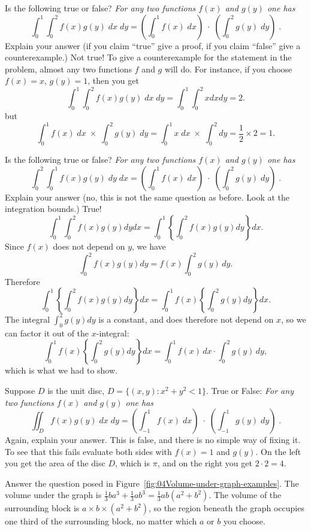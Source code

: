 \problem 
\subprob Is the following true or false? 
  \textit{For any two functions $f(x)$ and $g(y)$ one has}
\[
\int_0^1 \int_0^2 f(x) g(y) \; dx\; dy
= 
\left(\int_0^1 f(x) \; dx\right)
\; \cdot\; 
\left(\int_0^2 g(y)\; dy\right)
\; .
\]
Explain your answer  (if you claim ``true'' give a proof, if you claim ``false'' give
a counterexample.)
\answer
Not true!
To give a counterexample for the statement in the problem, almost any
two functions $f$ and $g$ will do.  For instance, if you choose $f(x) = x$, $g(y)=1$, then you get
\[
\int_0^1 \int_0^2 f(x) g(y) \; dx\; dy= \int_0^1\int_0^2 xdx dy = 2.
\]
but
\[
\int_0^1 f(x) \; dx\; \times\; 
\int_0^2 g(y)\; dy
=
\int_0^1 x \; dx\; \times\; 
\int_0^2  dy
=
\frac{1}{2}\times2 = 1.
\]
\endanswer

\subprob Is the following true or false? 
  \textit{For any two functions $f(x)$ and $g(y)$ one has}
\[
\int_0^2 \int_0^1 f(x) g(y) \; dy\; dx
= 
\left(\int_0^1 f(x) \; dx\right)
\; \cdot\; 
\left(\int_0^2 g(y)\; dy\right)
\; .
\]
Explain your answer (no, this is not the same question as before.  Look at the
integration bounds.) 
\answer
True!
\[
  \int_0^1\int_0^2 f(x)g(y) dy dx
  =\int_0^1\left\{ \int_0^2 f(x)g(y) dy \right\}dx .
\]
Since $f(x)$ does not depend on $y$, we have
\[
\int_0^2 f(x)g(y) dy=f(x) \int_0^2 g(y)\, dy.
\]
Therefore 
\[
  \int_0^1\left\{ \int_0^2 f(x)g(y) dy \right\}dx 
  =\int_0^1 f(x) \left\{\int_0^2 g(y) dy \right\}dx .
\]
The integral $\int_0^2 g(y)dy$ is a constant, and does therefore not depend on $x$,
so we can factor it out of the $x$-integral:
\[
  \int_0^1 f(x) \left\{\int_0^2 g(y) dy \right\}dx
  = \int_0^1 f(x)\, dx \cdot \int_0^2 g(y)\, dy,
\]
which is what we had to show.
\endanswer

\subprob Suppose $D$ is the unit disc, $D=\{(x,y): x^2+y^2<1\}$.  True or False:
\textit{For any two functions $f(x)$ and $g(y)$ one has}
\[
\iint_ D f(x) g(y) \; dx\; dy
= 
\left(\int_{-1}^1 f(x) \; dx\right)
\; \cdot\; 
\left(\int_{-1}^1 g(y)\; dy\right)
\; .
\]
Again, explain your answer.
\answer
This is false, and there is no simple way of fixing it.  To see that this fails
evaluate both sides with $f(x) = 1$ and $g(y)$.  On the left you get the area of
the disc $D$, which is $\pi$, and on the right you get $2\cdot2=4$.
\endanswer


\problem Answer the question posed in
Figure~\ref{fig:04Volume-under-graph-examples}.
\answer
The volume under the graph is
$\frac13 ba^3 + \frac13 ab^3 = \frac 13 ab(a^2+b^2)$.
The volume of the surrounding block is $a\times b\times (a^2+b^2)$, so
the region beneath the graph occupies one third of the surrounding
block, no matter which $a$ or $b$ you choose.
\endanswer


